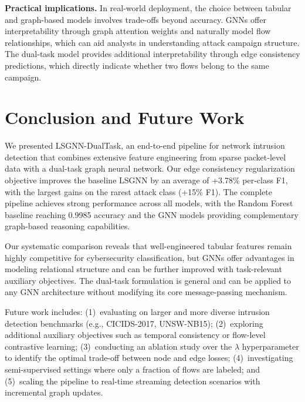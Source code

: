 \documentclass[conference]{IEEEtran}
\begin{document}
\textbf{Practical implications.} In real-world deployment, the choice between tabular and graph-based models involves trade-offs beyond accuracy. GNNs offer interpretability through graph attention weights and naturally model flow relationships, which can aid analysts in understanding attack campaign structure. The dual-task model provides additional interpretability through edge consistency predictions, which directly indicate whether two flows belong to the same campaign.

\section{Conclusion and Future Work}

We presented LSGNN-DualTask, an end-to-end pipeline for network intrusion detection that combines extensive feature engineering from sparse packet-level data with a dual-task graph neural network. Our edge consistency regularization objective improves the baseline LSGNN by an average of +3.78\% per-class F1, with the largest gains on the rarest attack class (+15\% F1). The complete pipeline achieves strong performance across all models, with the Random Forest baseline reaching 0.9985 accuracy and the GNN models providing complementary graph-based reasoning capabilities.

Our systematic comparison reveals that well-engineered tabular features remain highly competitive for cybersecurity classification, but GNNs offer advantages in modeling relational structure and can be further improved with task-relevant auxiliary objectives. The dual-task formulation is general and can be applied to any GNN architecture without modifying its core message-passing mechanism.

Future work includes: (1)~evaluating on larger and more diverse intrusion detection benchmarks (e.g., CICIDS-2017, UNSW-NB15); (2)~exploring additional auxiliary objectives such as temporal consistency or flow-level contrastive learning; (3)~conducting an ablation study over the $\lambda$ hyperparameter to identify the optimal trade-off between node and edge losses; (4)~investigating semi-supervised settings where only a fraction of flows are labeled; and (5)~scaling the pipeline to real-time streaming detection scenarios with incremental graph updates.

\end{document}
